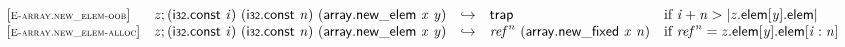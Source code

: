 \vspace{1ex}

$$
\begin{array}{@{}l@{}lcl@{}l@{}}
{[\textsc{\scriptsize E{-}array.new\_elem{-}oob}]} \quad & {\mathit{z}} ; (\mathsf{i{\scriptstyle32}}.\mathsf{const}~{\mathit{i}})~(\mathsf{i{\scriptstyle32}}.\mathsf{const}~{\mathit{n}})~(\mathsf{array.new\_elem}~{\mathit{x}}~{\mathit{y}}) &\hookrightarrow& \mathsf{trap} &\quad
  \mbox{if}~{\mathit{i}} + {\mathit{n}} > {|{{\mathit{z}}.\mathsf{elem}}{{}[{\mathit{y}}]}.\mathsf{elem}|} \\
{[\textsc{\scriptsize E{-}array.new\_elem{-}alloc}]} \quad & {\mathit{z}} ; (\mathsf{i{\scriptstyle32}}.\mathsf{const}~{\mathit{i}})~(\mathsf{i{\scriptstyle32}}.\mathsf{const}~{\mathit{n}})~(\mathsf{array.new\_elem}~{\mathit{x}}~{\mathit{y}}) &\hookrightarrow& {{\mathit{ref}}^{{\mathit{n}}}}~(\mathsf{array.new\_fixed}~{\mathit{x}}~{\mathit{n}}) &\quad
  \mbox{if}~{{\mathit{ref}}^{{\mathit{n}}}} = {{\mathit{z}}.\mathsf{elem}}{{}[{\mathit{y}}]}.\mathsf{elem}{}[{\mathit{i}} : {\mathit{n}}] \\
\end{array}
$$

\vspace{1ex}

